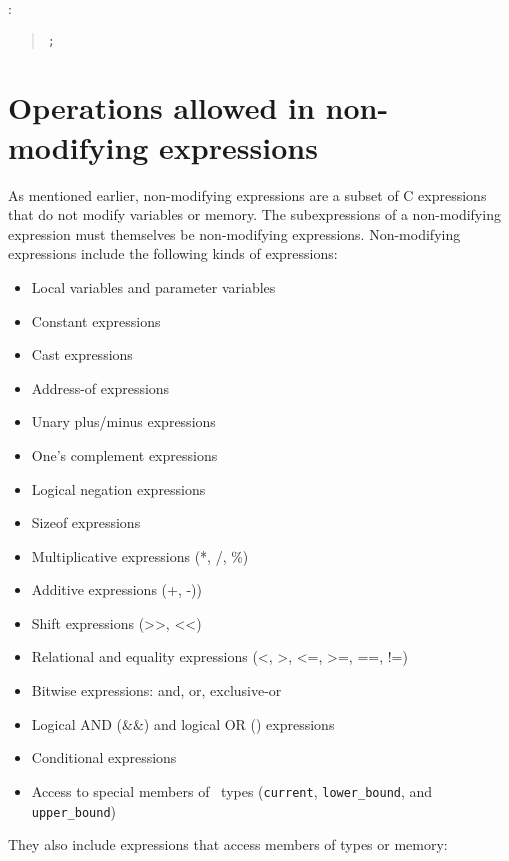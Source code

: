 :

\begin{quote}
\texttt{;}
\end{quote}

\section{Operations allowed in non-modifying expressions}
\label{section:non-modifying-expressions}

As mentioned earlier, non-modifying expressions are a subset of C
expressions that do not modify variables or memory. The subexpressions
of a non-modifying expression must themselves be non-modifying
expressions. Non-modifying expressions include the following kinds of
expressions:

\begin{itemize}
\item
  Local variables and parameter variables
\item
  Constant expressions
\item
  Cast expressions
\item
  Address-of expressions
\item
  Unary plus/minus expressions
\item
  One's complement expressions
\item
  Logical negation expressions
\item
  Sizeof expressions
\item
  Multiplicative expressions (*, /, \%)
\item
  Additive expressions (+, -))
\item
  Shift expressions (\textgreater{}\textgreater{},
  \textless{}\textless{})
\item
  Relational and equality expressions (\textless{}, \textgreater{},
  \textless{}=, \textgreater{}=, ==, !=)
\item
  Bitwise expressions: and, or, exclusive-or
\item
  Logical AND (\&\&) and logical OR (\textbar{}\textbar{}) expressions
\item
  Conditional expressions
\item
  Access to special members of \arrayview\ types
  (\texttt{current}, \texttt{lower\_bound}, and \texttt{upper\_bound})
\end{itemize}

They also include expressions that access members of types or memory:

